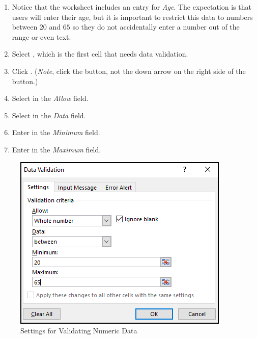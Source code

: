 \begin{enumerate}
	\item Notice that the  worksheet includes an entry for \textit{Age}. The expectation is that users will enter their age, but it is important to restrict this data to numbers between $ 20 $ and $ 65 $ so they do not accidentally enter a number out of the range or even text.
	\item Select , which is the first cell that needs data validation. 
	\item Click . (\textit{Note}, click the button, not the down arrow on the right side of the button.)
	\item Select  in the \textit{Allow} field.
	\item Select  in the \textit{Data} field.
	\item Enter  in the \textit{Minimum} field.
	\item Enter  in the \textit{Maximum} field.
\end{enumerate}

\begin{figure}[H]
	\centering
	\includegraphics[width=\maxwidth{.75\linewidth}]{gfx/ch07_fig39}
	\caption{Settings for Validating Numeric Data}
	\label{07:fig39}
\end{figure}

